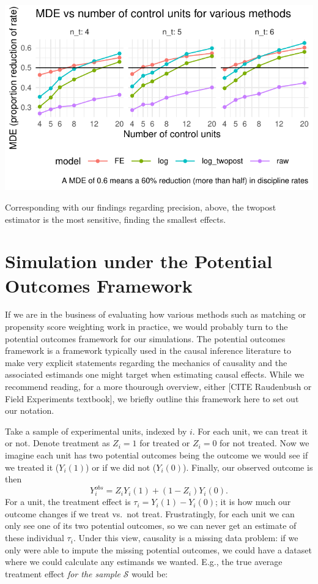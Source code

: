 \documentclass[
]{book}
\begin{document}
\begin{center}\includegraphics[width=0.75\linewidth]{Designing-Simulations-in-R_files/figure-latex/disc_mde-1} \end{center}

Corresponding with our findings regarding precision, above, the twopost estimator is the most sensitive, finding the smallest effects.

\chapter{Simulation under the Potential Outcomes Framework}\label{chap-potential-outcomes}

If we are in the business of evaluating how various methods such as matching or propensity score weighting work in practice, we would probably turn to the potential outcomes framework for our simulations.
The potential outcomes framework is a framework typically used in the causal inference literature to make very explicit statements regarding the mechanics of causality and the associated estimands one might target when estimating causal effects.
While we recommend reading, for a more thourough overview, either {[}CITE Raudenbush or Field Experiments textbook{]}, we briefly outline this framework here to set out our notation.

Take a sample of experimental units, indexed by \(i\).
For each unit, we can treat it or not.
Denote treatment as \(Z_i = 1\) for treated or \(Z_i = 0\) for not treated.
Now we imagine each unit has two potential outcomes being the outcome we would see if we treated it (\(Y_i(1)\)) or if we did not (\(Y_i(0)\)).
Finally, our observed outcome is then
\[ Y_i^{obs} = Z_i Y_i(1) + (1-Z_i)Y_i(0) .\]
For a unit, the treatment effect is \(\tau_i = Y_i(1) - Y_i(0)\); it is how much our outcome changes if we treat vs.~not treat.
Frustratingly, for each unit we can only see one of its two potential outcomes, so we can never get an estimate of these individual \(\tau_i\).
Under this view, causality is a missing data problem: if we only were able to impute the missing potential outcomes, we could have a dataset where we could calculate any estimands we wanted. E.g., the true average treatment effect \emph{for the sample} \(\mathcal{S}\) would be:
\end{document}

